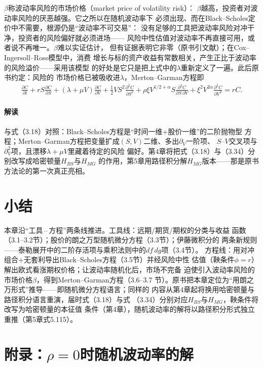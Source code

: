 $\beta$称波动率风险的市场价格（market price of volatility risk）：
$\beta$越高，投资者对波动率风险的厌恶越强。它之所以在随机波动率下
必须出现、而在Black--Scholes定价中不需要，根源仍是“波动率不可交易”：
没有足够的工具把波动率风险对冲干净，投资者的风险偏好就必须进场——
风险中性估值对波动率不再直接可用，或者说不再唯一。$\beta$难以实证估计，
但有证据表明它非零（原书引文献）；在Cox--Ingersoll--Ross模型中，消费
增长与标的资产收益有常数相关，产生正比于波动率的风险溢价——采用该模型
的好处是它只是把上式中的$\lambda$重新定义了一遍。此后原书约定：风险的
市场价格已被吸收进$\lambda$，Merton--Garman方程即
\begin{align*}
\frac{\partial C}{\partial t}
+rS\frac{\partial C}{\partial S}
+(\lambda+\mu V)\frac{\partial C}{\partial V}
+\frac{1}{2}VS^{2}\frac{\partial^{2}C}{\partial S^{2}}
+\rho\xi V^{1/2+\alpha}S\frac{\partial^{2}C}{\partial S\,\partial V}
+\xi^{2}V^{2\alpha}\frac{\partial^{2}C}{\partial V^{2}}
=rC.
\tag{3.34}
\end{align*}

\paragraph{解读}
与式（3.18）对照：Black--Scholes方程是“时间一维+股价一维”的二阶抛物型
方程；Merton--Garman方程把变量扩成$(S,V)$二维、多出$\partial_V$一阶项、
$S$--$V$交叉项与$\partial_V^2$项，且漂移$\lambda+\mu V$里藏着待定的风险
偏好。第4章将把式（3.18）与（3.34）分别改写成哈密顿量$H_{BS}$与$H_{MG}$
的作用，第5章用路径积分解$H_{MG}$版本——那是原书方法论的第一次真正亮相。

\section{小结}

本章沿“工具\,--\,方程”两条线推进。工具线：远期/期货/期权的分类与收益
函数（3.1--3.2节）；股价的朗之万型随机微分方程（3.3节）；伊藤微积分的
两条新规则——泰勒展开中的二阶存活项与乘积法则中的$df\,dg$项（3.4节）。
方程线：用对冲组合+无套利导出Black--Scholes方程（3.5节）并经风险中性
估值（鞅条件$\phi=r$）解出欧式看涨期权价格；让波动率随机化后，市场不完备
迫使引入波动率风险的市场价格$\beta$，得到Merton--Garman方程（3.6--3.7
节）。原书把本章定位为“用朗之万形式”推导——即随机微分方程语言；同样的
内容从第4章起将换用哈密顿量与路径积分语言重演，届时式（3.18）与式
（3.34）分别对应$H_{BS}$与$H_{MG}$，鞅条件将改写为哈密顿量的本征值
条件（第4章），随机波动率的解将以路径积分形式独立重推（第5章式5.115）。

\section{附录：$\rho=0$时随机波动率的解}


